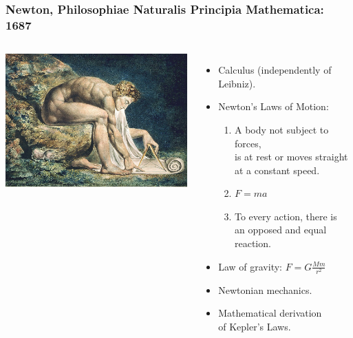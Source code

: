 \documentclass[aspectratio=169,xcolor=pdftex,dvipsnames]{beamer} %
\begin{document}
\begin{frame}
\frametitle{Newton, Philosophiae Naturalis Principia Mathematica: 1687}

\begin{columns}
      \includegraphics[width=80mm]{divineGeometer.jpg}
   

\begin{itemize}
\item
Calculus (independently of Leibniz).
\item 
Newton's Laws of Motion:
   \begin{enumerate}
   \item
   A body not subject to forces,\\ is at rest or moves straight\\ at a constant speed.
   \item
   $F = ma$
  \item
  To every action, there is\\ an opposed and equal reaction.
   \end{enumerate}
\item
Law of gravity:
$F = G\frac{M m}{r^2}$
\item 
Newtonian mechanics.
\item
Mathematical derivation\\ of Kepler's Laws.
\end{itemize}
\end{columns} 

\end{frame}
\end{document}

